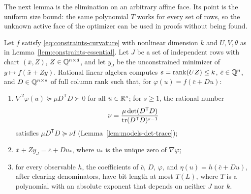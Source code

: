 The next lemma is the elimination on an arbitrary affine face. Its point is
the uniform size bound: the same polynomial $T$ works for every set of rows,
so the unknown active face of the optimizer can be used in proofs without
being found.

\begin{lemma}
\label{lem:constraints-elimination}
Let $f$ satisfy \eqref{eq:constraints-curvature} with nonlinear dimension $k$
and $U,V,\theta$ as in Lemma~\ref{lem:constraints-essential}. Let $J$ be a set
of independent rows with chart $(\bar x,Z)$, $Z\in\mathbb Q^{n\times d}$, and let
$y_J$ be the unconstrained minimizer of $y\mapsto f(\bar x+Zy)$. Rational
linear algebra computes $s=\operatorname{rank}(UZ)\le k$, $\bar c\in\mathbb Q^n$, and
$D\in\mathbb Q^{n\times s}$ of full column rank such that, for
$\varphi(u)=f(\bar c+Du)$:
\begin{enumerate}[label=(\roman*)]
\item $\nabla^2\varphi(u)\succeq\mu D^{\mathsf T}D\succ0$ for all $u\in\mathbb R^s$;
for $s\ge1$, the rational number
\[
 \nu=\frac{\mu\det(D^{\mathsf T}D)}{\operatorname{tr}(D^{\mathsf T}D)^{s-1}}
\]
satisfies $\mu D^{\mathsf T}D\succeq\nu I$ (Lemma~\ref{lem:models-det-trace});
\item $\bar x+Zy_J=\bar c+Du_*$, where $u_*$ is the unique zero of
$\nabla\varphi$;
\item for every observable $h$, the coefficients of $\bar c$, $D$, $\varphi$,
and $\eta(u)=h(\bar c+Du)$, after clearing denominators, have bit length at most
$T(L)$, where $T$ is a polynomial with an absolute exponent that depends on
neither $J$ nor $k$.
\end{enumerate}
\end{lemma}

